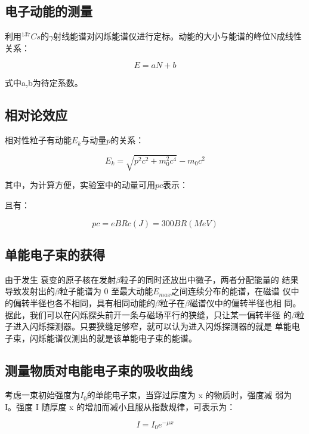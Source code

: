 \documentclass[a4paper,UTF8]{ctexart}
\begin{document}
\subsection{电子动能的测量}

利用$^{137}Cs$的$\gamma$射线能谱对闪烁能谱仪进行定标。动能的大小与能谱的峰位N成线性关系：

\begin{equation}
    E = aN + b
\end{equation}

式中a,b为待定系数。

\subsection{相对论效应}

相对性粒子有动能$E_k$与动量$p$的关系：

\begin{equation}
    E_{k} = \sqrt{p^2c^2 + m_{0}^{2}c^4}-m_{0}c^2
\end{equation}

其中，为计算方便，实验室中的动量可用$pc$表示：

且有：

\begin{equation}
    pc = eBRc(J) = 300BR (MeV)
\end{equation}

\subsection{单能电子束的获得}

由于发生衰变的原子核在发射$\beta$粒子的同时还放出中微子，两者分配能量的
结果导致发射出的$\beta$粒子能谱为 0 至最大动能$E_{max}$之间连续分布的能谱，在磁谱
仪中的偏转半径也各不相同，具有相同动能的$\beta$粒子在$\beta$磁谱仪中的偏转半径也相
同。据此，我们可以在闪烁探头前开一条与磁场平行的狭缝，只让某一偏转半径
的$\beta$粒子进入闪烁探测器。只要狭缝足够窄，就可以认为进入闪烁探测器的就是
单能电子束，闪烁能谱仪测出的就是该单能电子束的能谱。

\subsection{测量物质对电能电子束的吸收曲线}

考虑一束初始强度为$I_0$的单能电子束，当穿过厚度为 x 的物质时，强度减
弱为 I。强度 I 随厚度 x 的增加而减小且服从指数规律，可表示为：

\begin{equation}
    I = I_0 e^{-\mu x}
\end{equation}
\end{document}
